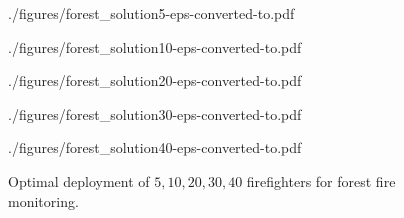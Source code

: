 \begin{figure}[ht!]
    \vspace*{-2mm}
	\begin{center}
		\begin{overpic}[width={\ifoc 4in \else 2.4in \fi},tics=5]{./figures/forest_solution5-eps-converted-to.pdf}
		\end{overpic}
    \end{center}
	\begin{center}
		\begin{overpic}[width={\ifoc 4in \else 2.4in \fi},tics=5]{./figures/forest_solution10-eps-converted-to.pdf}
		\end{overpic}
    \end{center}
	\begin{center}
		\begin{overpic}[width={\ifoc 4in \else 2.4in \fi},tics=5]{./figures/forest_solution20-eps-converted-to.pdf}
		\end{overpic}
    \end{center}
	\begin{center}
		\begin{overpic}[width={\ifoc 4in \else 2.4in \fi},tics=5]{./figures/forest_solution30-eps-converted-to.pdf}
		\end{overpic}
    \end{center}
	\begin{center}
		\begin{overpic}[width={\ifoc 4in \else 2.4in \fi},tics=5]{./figures/forest_solution40-eps-converted-to.pdf}
		\end{overpic}
	\end{center}
	\vspace*{-2mm}
	\caption{\label{fig:opg-more-forest}  Optimal deployment of $5, 10, 20, 30, 40$ firefighters for 
	forest fire monitoring.}
	\vspace*{-3mm}
\end{figure}

